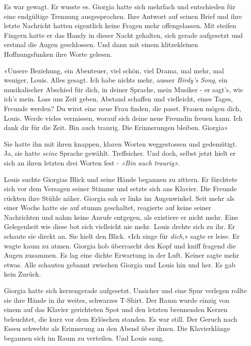 Es war gewagt. Er wusste es. Giorgia hatte sich mehrfach und entschieden
für eine endgültige Trennung ausgesprochen.
Ihre Antwort auf seinen Brief und ihre letzte Nachricht hatten
eigentlich keine Fragen mehr offengelassen. Mit steifen Fingern hatte
er das Handy in dieser Nacht gehalten, sich gerade aufgesetzt und
erstmal die Augen geschlossen. Und dann mit einem klitzekleinen
Hoffnungsfunken ihre Worte gelesen.

«Unsere Beziehung, ein Abenteuer, viel schön, viel Drama, mal mehr, mal
weniger, Louis. Alles gesagt. Ich habe nichts mehr, ausser \emph{Birdy’s
Song}, ein musikalischer Abschied für dich, in deiner Sprache, mein
Musiker - er sagt’s, wie ich’s mein. Lass uns Zeit geben, Abstand
schaffen und vielleicht, eines Tages, Freunde werden? Du wirst eine neue
Frau finden, die passt. Frauen mögen dich, Louis. Werde vieles
vermissen, worauf sich deine neue Freundin freuen kann. Ich dank dir
für die Zeit. Bin auch traurig. Die Erinnerungen bleiben. Giorgia»


Sie hatte ihn mit ihren knappen, klaren Worten weggestossen und gedemütigt. Ja, sie hatte \emph{seine} Sprache gewählt. Treffsicher. Und doch, selbst jetzt hielt er sich an ihren letzten drei Worten fest -  \emph{«Bin auch traurig»}. 

\sectionbreak

Louis suchte Giorgias Blick und seine Hände begannen zu zittern. Er fürchtete sich vor dem Versagen seiner Stimme und setzte sich ans Klavier.
Die Freunde rückten ihre Stühle näher. Giorgia sah er links im
Augenwinkel. Seit mehr als einer Woche hatte sie auf stumm geschaltet, 
reagierte auf keine seiner Nachrichten und nahm keine Anrufe entgegen, als
existiere er nicht mehr. Eine Gelegenheit wie diese bot sich vielleicht
nie mehr.
Louis drehte sich zu ihr. Er schaute sie direkt an. Sie hielt den Blick.
«Ich singe für \emph{dich},» sagte er leise. Er wagte kaum zu atmen. Giorgia hob überrascht den Kopf und 
kniff fragend die Augen zusammen. Es lag eine dichte Erwartung in der Luft. Keiner sagte mehr etwas. 
Alle schauten gebannt zwischen Giorgia und Louis hin und her.
Es gab kein Zurück.

\sectionbreak

Giorgia hatte sich kerzengerade aufgesetzt. Unsicher und eine Spur
verlegen rollte sie ihre Hände in ihr weites, schwarzes T-Shirt. Der Raum wurde einzig von einem auf das Klavier gerichteten Spot und 
den letzten brennenden Kerzen beleuchtet, 
die kurz vor dem Erlöschen standen. Es war still.
Der Geruch nach Essen schwebte als Erinnerung an den Abend über ihnen.
Die Klavierklänge begannen sich im Raum zu verteilen. Und Louis sang.

